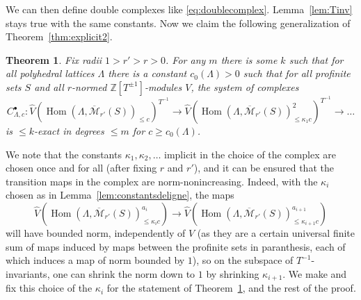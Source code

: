 \documentclass[11pt]{amsbook}
\DeclareMathOperator{\Hom}{Hom}
\numberwithin{equation}{section}
\newtheorem{theorem}{Theorem}
\numberwithin{theorem}{section}
\theoremstyle{definition}
\begin{document}
We can then define double complexes like \eqref{eq:doublecomplex}. Lemma~\ref{lem:Tinv} stays true with the same constants. Now we claim the following generalization of Theorem~\ref{thm:explicit2}.

\begin{theorem}\label{thm:explicit3} Fix radii $1>r'>r>0$. For any $m$ there is some $k$ such that for all polyhedral lattices $\Lambda$ there is a constant $c_0(\Lambda)>0$ such that for all profinite sets $S$ and all $r$-normed $\mathbb Z[T^{\pm 1}]$-modules $V$, the system of complexes
\[
C_{\Lambda,c}^\bullet: \widehat{V}(\Hom(\Lambda,\overline{\mathcal M}_{r'}(S))_{\leq c})^{T^{-1}}\to \widehat{V}(\Hom(\Lambda,\overline{\mathcal M}_{r'}(S))_{\leq \kappa_1c}^2)^{T^{-1}}\to \ldots
\]
is $\leq k$-exact in degrees $\leq m$ for $c\geq c_0(\Lambda)$.
\end{theorem}

We note that the constants $\kappa_1,\kappa_2,\ldots$ implicit in the choice of the complex are chosen once and for all (after fixing $r$ and $r'$), and it can be ensured that the transition maps in the complex are norm-nonincreasing. Indeed, with the $\kappa_i$ chosen as in Lemma~\ref{lem:constantsdeligne}, the maps
\[
\widehat{V}(\Hom(\Lambda,\overline{\mathcal M}_{r'}(S))_{\leq \kappa_ic}^{a_i})\to \widehat{V}(\Hom(\Lambda,\overline{\mathcal M}_{r'}(S))_{\leq \kappa_{i+1}c}^{a_{i+1}})
\]
will have bounded norm, independently of $V$ (as they are a certain universal finite sum of maps induced by maps between the profinite sets in paranthesis, each of which induces a map of norm bounded by $1$), so on the subspace of $T^{-1}$-invariants, one can shrink the norm down to $1$ by shrinking $\kappa_{i+1}$. We make and fix this choice of the $\kappa_i$ for the statement of Theorem~\ref{thm:explicit3}, and the rest of the proof.
\end{document}
